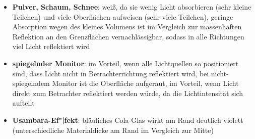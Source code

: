 \linie
\begin{itemize}
    \item
    \textbf{Pulver, Schaum, Schnee}:
    weiß, da sie wenig Licht absorbieren (sehr kleine Teilchen) und
    viele Oberflächen aufweisen (sehr viele Teilchen), geringe Absorption wegen
    des kleines Volumens ist im Vergleich zur massenhaften Reflektion an
    den Grenzflächen vernachlässigbar, sodass in alle Richtungen viel
    Licht reflektiert wird
\end{itemize}
\linie
\begin{itemize}
    \item
    \textbf{spiegelnder Monitor}:
    im Vorteil, wenn alle Lichtquellen so positioniert sind, dass Licht nicht
    in Betrachterrichtung reflektiert wird,
    bei nicht-spiegelndem Monitor ist die Oberfläche aufgeraut,
    im Vorteil, wenn Licht direkt zum Betrachter reflektiert werden würde,
    da die Lichtintensität sich aufteilt
    
    \item
    \textbf{Usambara-Ef"|fekt}:
    bläuliches Cola-Glas wirkt am Rand deutlich violett
    (unterschiedliche Materialdicke am Rand im Vergleich zur Mitte)
\end{itemize}

\pagebreak
